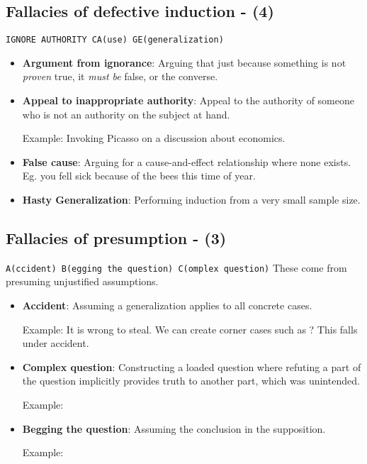 \documentclass[5pt]{book}
\begin{document}
\subsection{Fallacies of defective induction - (4)}
\texttt{IGNORE AUTHORITY CA(use) GE(generalization)}
\begin{itemize}
    \item \textbf{Argument from ignorance}: Arguing that just because something
        is not \emph{proven} true, it \textit{must be} false, or the converse.
    \item \textbf{Appeal to inappropriate authority}: Appeal to the authority
        of someone who is not an authority on the subject at hand. 

        Example: Invoking Picasso on a discussion about economics.

    \item \textbf{False cause}: Arguing for a cause-and-effect relationship
        where none exists. Eg. you fell sick because of the bees this time
        of year.

    \item \textbf{Hasty Generalization}: Performing induction from a very
        small sample size.
\end{itemize}

\subsection{Fallacies of presumption - (3)}
\texttt{A(ccident) B(egging the question) C(omplex question)}
These come from presuming unjustified assumptions.
\begin{itemize}
    \item \textbf{Accident}: Assuming a generalization applies to all concrete
        cases. 

        Example: It is wrong to steal. We can create corner cases such as 
        ? This falls under accident.

    \item \textbf{Complex question}: Constructing a loaded question where
        refuting a part of the question implicitly provides truth to another
        part, which was unintended.

        Example: 

    \item \textbf{Begging the question}: Assuming the conclusion in the 
        supposition.

        Example: 
\end{itemize}
\end{document}
